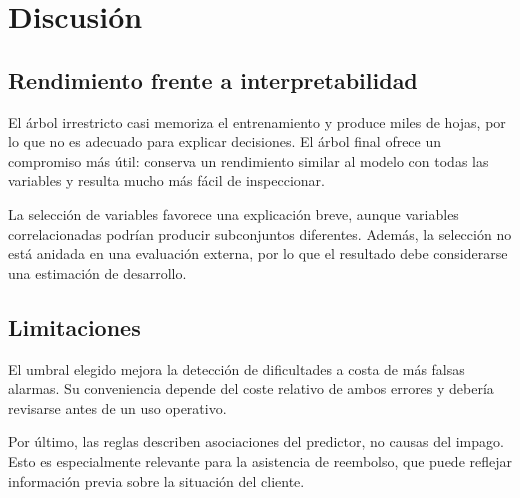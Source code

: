 \chapter{Discusión} \label{chp:discussion}


\section{Rendimiento frente a interpretabilidad}

El árbol irrestricto casi memoriza el entrenamiento y produce miles de hojas,
por lo que no es adecuado para explicar decisiones. El árbol final ofrece un
compromiso más útil: conserva un rendimiento similar al modelo con todas las
variables y resulta mucho más fácil de inspeccionar.

La selección de variables favorece una explicación breve, aunque variables
correlacionadas podrían producir subconjuntos diferentes. Además, la selección
no está anidada en una evaluación externa, por lo que el resultado debe
considerarse una estimación de desarrollo.

\section{Limitaciones}

El umbral elegido mejora la detección de dificultades a costa de más falsas
alarmas. Su conveniencia depende del coste relativo de ambos errores y debería
revisarse antes de un uso operativo.

Por último, las reglas describen asociaciones del predictor, no causas del
impago. Esto es especialmente relevante para la asistencia de reembolso, que
puede reflejar información previa sobre la situación del cliente.
